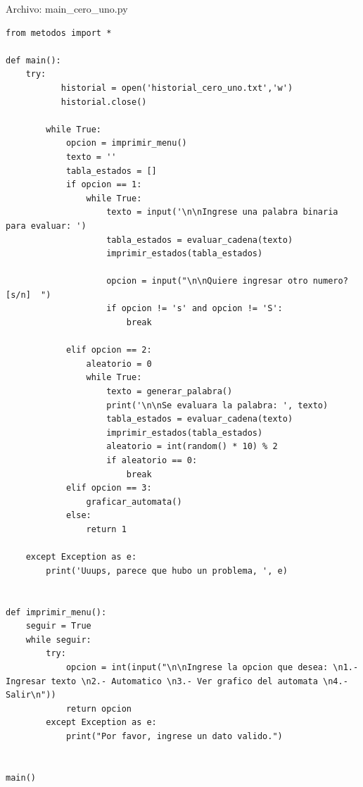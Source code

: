 \documentclass[12pt]{article}
\begin{document}
Archivo: main\_cero\_uno.py
\lstset{language=Python, breaklines=true, basicstyle=\footnotesize}
\begin{lstlisting}[frame=single]
from metodos import *

def main():
    try:
    	   historial = open('historial_cero_uno.txt','w')
    	   historial.close()
        
        while True:
            opcion = imprimir_menu()
            texto = ''
            tabla_estados = []
            if opcion == 1:
                while True:
                    texto = input('\n\nIngrese una palabra binaria para evaluar: ')
                    tabla_estados = evaluar_cadena(texto)
                    imprimir_estados(tabla_estados)

                    opcion = input("\n\nQuiere ingresar otro numero? [s/n]  ")
                    if opcion != 's' and opcion != 'S':
                        break

            elif opcion == 2:
                aleatorio = 0
                while True:
                    texto = generar_palabra()
                    print('\n\nSe evaluara la palabra: ', texto)
                    tabla_estados = evaluar_cadena(texto)
                    imprimir_estados(tabla_estados)
                    aleatorio = int(random() * 10) % 2
                    if aleatorio == 0:
                        break
            elif opcion == 3:
                graficar_automata()
            else:
                return 1

    except Exception as e:
        print('Uuups, parece que hubo un problema, ', e)


def imprimir_menu():
    seguir = True
    while seguir:
        try:
            opcion = int(input("\n\nIngrese la opcion que desea: \n1.- Ingresar texto \n2.- Automatico \n3.- Ver grafico del automata \n4.- Salir\n"))
            return opcion
        except Exception as e:
            print("Por favor, ingrese un dato valido.")


main()

\end{lstlisting}

\vspace{1em}
\end{document}
